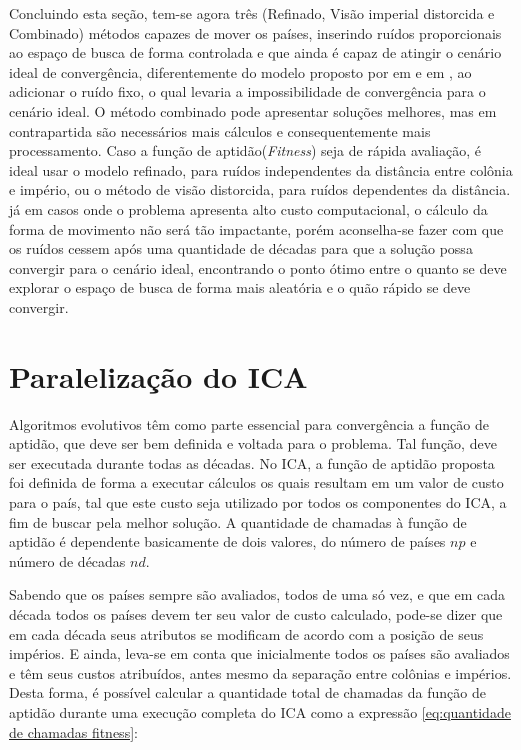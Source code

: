 Concluindo esta seção, tem-se agora três (Refinado, Visão imperial distorcida e Combinado) métodos capazes de mover os países, inserindo ruídos proporcionais ao espaço de busca de forma controlada e que ainda é capaz de atingir o cenário ideal de convergência, diferentemente do modelo proposto por \citeauthor{atashpaz2007imperialist} em \cite{atashpaz2007imperialist} e \citeauthor{roche2011imperialist} em \cite{roche2011imperialist}, ao adicionar o ruído fixo, o qual levaria a impossibilidade de convergência para o cenário ideal. O método combinado pode apresentar soluções melhores, mas em contrapartida são necessários mais cálculos e consequentemente mais processamento. Caso a função de aptidão(\emph{Fitness}) seja de rápida avaliação, é ideal usar o modelo refinado, para ruídos independentes da distância entre colônia e império, ou o método de visão distorcida, para ruídos dependentes da distância. já em casos onde o problema apresenta alto custo computacional, o cálculo da forma de movimento não será tão impactante, porém aconselha-se fazer com que os ruídos cessem após uma quantidade de décadas para que a solução possa convergir para o cenário ideal, encontrando o ponto ótimo entre o quanto se deve explorar o espaço de busca de forma mais aleatória e o quão rápido se deve convergir. 






\section{Paralelização do ICA}
\label{Paralelização do ICA}


Algoritmos evolutivos têm como parte essencial para convergência a função de aptidão, que deve ser bem definida e voltada para o problema. Tal função, deve ser executada durante todas as décadas. No ICA, a função de aptidão proposta foi definida de forma a executar cálculos os quais resultam em um valor de custo para o país, tal que este custo seja utilizado por todos os componentes do ICA, a fim de buscar pela melhor solução. A quantidade de chamadas à função de aptidão é dependente basicamente de dois valores, do número de países \(np\) e número de décadas \(nd\). 


Sabendo que os países sempre são avaliados, todos de uma só vez, e que em cada década todos os países devem ter seu valor de custo calculado, pode-se dizer que em cada década seus atributos se modificam de acordo com a posição de seus impérios. E ainda, leva-se em conta que inicialmente todos os países são avaliados e têm seus custos atribuídos, antes mesmo da separação entre colônias e impérios. Desta forma, é possível calcular a quantidade total de chamadas da função de aptidão durante uma execução completa do ICA como a expressão \ref{eq:quantidade de chamadas fitness}:


